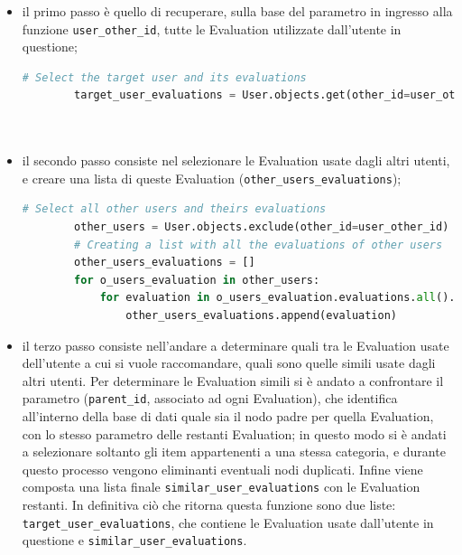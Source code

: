 \begin{itemize}
    \item il primo passo è quello di recuperare, sulla base del parametro in ingresso alla funzione \texttt{user\_other\_id}, 
    tutte le Evaluation utilizzate dall'utente in questione;
    \begin{lstlisting}[language=Python, label=lst:UB_CF_2]
        # Select the target user and its evaluations
        target_user_evaluations = User.objects.get(other_id=user_other_id).evaluations.all()\
                                                                          .values('other_id', 'parent_id')\
                                                                          .order_by('other_id')
    \end{lstlisting}
    \item il secondo passo consiste nel selezionare le Evaluation usate dagli altri utenti, e creare una lista di queste Evaluation 
    (\texttt{other\_users\_evaluations});
    \begin{lstlisting}[language=Python, label=lst:UB_CF_3]
        # Select all other users and theirs evaluations
        other_users = User.objects.exclude(other_id=user_other_id)
        # Creating a list with all the evaluations of other users
        other_users_evaluations = []
        for o_users_evaluation in other_users:
            for evaluation in o_users_evaluation.evaluations.all().values('other_id', 'parent_id').order_by('other_id'):
                other_users_evaluations.append(evaluation)
    \end{lstlisting}
    \item il terzo passo consiste nell'andare a determinare quali tra le Evaluation usate dell'utente a cui si vuole raccomandare, quali sono quelle 
    simili usate dagli altri utenti. Per determinare le Evaluation simili si è andato a confrontare il parametro (\texttt{parent\_id}, 
    associato ad ogni Evaluation), che identifica all'interno della base di dati quale sia il nodo padre per quella Evaluation, con lo stesso 
    parametro delle restanti Evaluation; in questo modo si è andati a selezionare soltanto gli item appartenenti a una stessa categoria, e 
    durante questo processo vengono eliminanti eventuali nodi duplicati. Infine viene composta una lista finale \texttt{similar\_user\_evaluations} 
    con le Evaluation restanti.
    In definitiva ciò che ritorna questa funzione sono due liste: \texttt{target\_user\_evaluations}, che contiene le Evaluation usate dall'utente 
    in questione e \texttt{similar\_user\_evaluations}.

\end{itemize}
